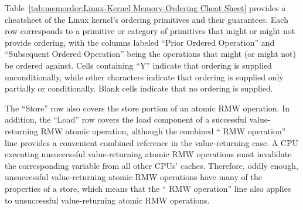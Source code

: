 \begin{table}[tbh]
\vspace{5pt}\hfill
{}\OneColumnHSpace{-0.9in}
\caption{Linux-Kernel Memory-Ordering Cheat Sheet}
\label{tab:memorder:Linux-Kernel Memory-Ordering Cheat Sheet}
\end{table}

Table~\ref{tab:memorder:Linux-Kernel Memory-Ordering Cheat Sheet}
provides a cheatsheet of the Linux kernel's ordering primitives and their
guarantees.
Each row corresponds to a primitive or category of primitives that might
or might not provide ordering, with the columns labeled
``Prior Ordered Operation'' and ``Subsequent Ordered Operation''
being the operations that might (or might not) be ordered against.
Cells containing ``Y'' indicate that ordering is supplied unconditionally,
while other characters indicate that ordering is supplied only partially or
conditionally.
Blank cells indicate that no ordering is supplied.

The ``Store'' row also covers the store portion of an atomic RMW operation.
In addition, the ``Load'' row covers the load
component of a successful value-returning  RMW atomic
operation, although the combined `` RMW operation''
line provides a convenient combined reference in the value-returning case.
A CPU executing unsuccessful value-returning atomic RMW operations must
invalidate the corresponding variable from all other CPUs' caches.
Therefore, oddly enough, unsuccessful value-returning atomic RMW
operations have many of the properties of a store, which means that the
`` RMW operation'' line also applies to unsuccessful
value-returning atomic RMW operations.

